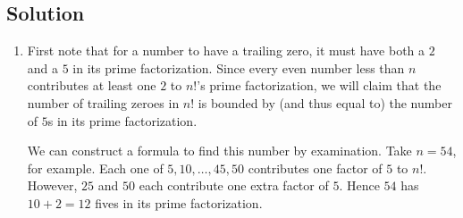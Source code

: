 \documentclass{article}
\begin{document}
\subsection*{Solution}
    \begin{enumerate}
        \item First note that for a number to have a trailing zero, it must have both a $2$ and a $5$ in its prime factorization. Since every even number less than $n$ contributes at least one $2$ to $n!$'s prime factorization, we will claim that the number of trailing zeroes in $n!$ is bounded by (and thus equal to) the number of $5$s in its prime factorization.
        
        \vspace{1.5mm}
        We can construct a formula to find this number by examination. Take $n = 54$, for example. Each one of $5, 10, \dots, 45, 50$ contributes one factor of $5$ to $n!$. However, $25$ and $50$ each contribute one extra factor of $5$. Hence $54$ has $10 + 2 = 12$ fives in its prime factorization.
        

\end{enumerate}
\end{document}
